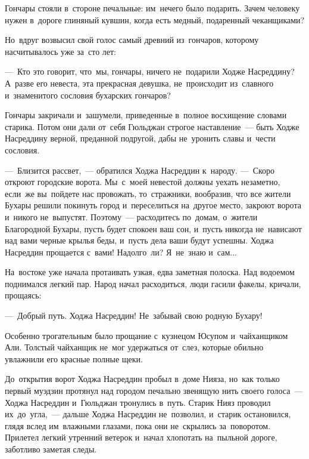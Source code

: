 \documentclass[12pt,a4paper]{book}
\begin{document}
Гончары стояли в~стороне печальные: им~нечего было подарить. Зачем человеку нужен в~дороге глиняный кувшин, когда есть медный, подаренный чеканщиками?

Но~вдруг возвысил свой голос самый древний из~гончаров, которому насчитывалось уже за~сто лет:

—~Кто это говорит, что~мы, гончары, ничего не~подарили Ходже Насреддину? А~разве его невеста, эта прекрасная девушка, не~происходит из~славного и~знаменитого сословия бухарских гончаров?

Гончары закричали и~зашумели, приведенные в~полное восхищение словами старика. Потом они дали от~себя Гюльджан строгое наставление~— быть Ходже Насреддину верной, преданной подругой, дабы не~уронить славы и~чести сословия.

—~Близится рассвет,~— обратился Ходжа Насреддин к~народу. —~Скоро откроют городские ворота. Мы~с~моей невестой должны уехать незаметно, если~же вы~пойдете нас провожать, то~стражники, вообразив, что все жители Бухары решили покинуть город и~переселиться на~другое место, закроют ворота и~никого не~выпустят. Поэтому~— расходитесь по~домам, о~жители Благородной Бухары, пусть будет спокоен ваш сон, и~пусть никогда не~нависают над вами черные крылья беды, и~пусть дела ваши будут успешны. Ходжа Насреддин прощается с~вами! Надолго~ли? Я~не~знаю и~сам...

На~востоке уже начала протаивать узкая, едва заметная полоска. Над водоемом поднимался легкий пар. Народ начал расходиться, люди гасили факелы, кричали, прощаясь:

—~Добрый путь. Ходжа Насреддин! Не~забывай свою родную Бухару!

Особенно трогательным было прощание с~кузнецом Юсупом и~чайханщиком Али. Толстый чайханщик не~мог удержаться от~слез, которые обильно увлажнили его красные полные щеки.

До~открытия ворот Ходжа Насреддин пробыл в~доме Нияза, но~как только первый муэдзин протянул над городом печально звенящую нить своего голоса~— Ходжа Насреддин и~Гюльджан тронулись в~путь. Старик Нияз проводил их~до~угла,~— дальше Ходжа Насреддин не~позволил, и~старик остановился, глядя вслед им~влажными глазами, пока они не~скрылись за~поворотом. Прилетел легкий утренний ветерок и~начал хлопотать на~пыльной дороге, заботливо заметая следы.
\end{document}
